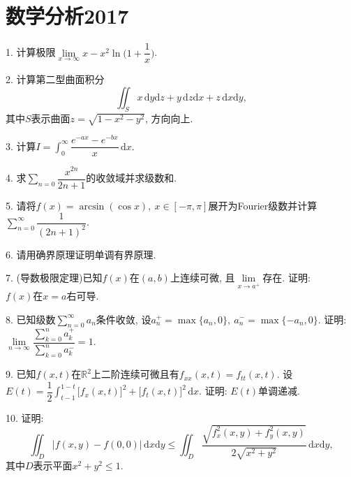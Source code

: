 \documentclass[12pt, a4paper, twoside]{ctexart}%
\newcommand{\rmd}{\mathrm{d}} %
\begin{document}
	\section{数学分析2017}
	1. 计算极限$\lim\limits_{x\rightarrow\infty}x-x^2\ln \Big(1+\dfrac{1}{x}\Big)$.\par 
	2. 计算第二型曲面积分\[\iint_Sx\,\rmd y\rmd z+y\,\rmd z\rmd x+z\,\rmd x\rmd y,\]其中$S$表示曲面$z=\sqrt{1-x^2-y^2}$, 方向向上.\par
	3. 计算$I=\int_0^\infty\dfrac{e^{-ax}-e^{-bx}}{x}\,\rmd x$.\par 
	4. 求$\sum\limits_{n=0}\dfrac{x^{2n}}{2n+1}$的收敛域并求级数和. \par
	5. 请将$f(x)=\arcsin(\cos x),\ x\in[-\pi,\pi]$展开为Fourier级数并计算$\sum\limits_{n=0}^\infty\dfrac{1}{(2n+1)^2}$.\par 
	6. 请用确界原理证明单调有界原理.\par
	7. (导数极限定理)已知$f(x)\mbox{在}(a,b)$上连续可微, 且$\lim\limits_{x\rightarrow a^+}$存在. 证明: $f(x)\mbox{在}x=a$右可导.\par
	8. 已知级数$\sum\limits_{n=0}^\infty a_n$条件收敛, 设$a_n^+=\max\{a_n,0\},\ a_n^-=\max\{-a_n,0\}$. 证明:$
	\lim\limits_{n\rightarrow\infty}\dfrac{\sum\limits_{k=0}^{n}a_k^+}{\sum\limits_{k=0}^{n}a_k^-}=1.$\par 
	9. 已知$f(x,t)$在$\mathbb{R}^{2}$上二阶连续可微且有$f_{xx}(x,t)=f_{tt}(x,t)$. 设$E(t)=\dfrac{1}{2}\int_{t-1}^{1-t}\big[f_x(x,t)\big]^2+\big[f_t(x,t)\big]^2\,\rmd x$. 证明: $E(t)$单调递减.\par
	10. 证明: \[
	\iint_D|f(x,y)-f(0,0)|\,\rmd x\rmd y\leq\iint_D\dfrac{\sqrt{f_x^2(x,y)+f_y^2(x,y)}}{2\sqrt{x^2+y^2}}\,\rmd x\rmd y,\]
	其中$D$表示平面$x^2+y^2\leq1$.\par 

	\clearpage
\end{document}
